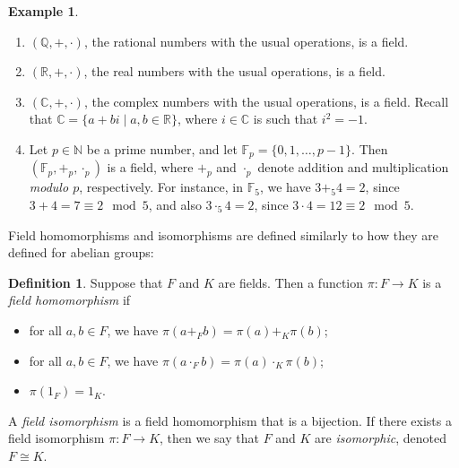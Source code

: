 \documentclass[a4paper]{memoir}
\theoremstyle{definition}
\newtheorem{definition}[theorem]{Definition}
\newtheorem{example}[theorem]{Example}
\newcommand{\bb}{\mathbb}
\newcommand{\ra}{\rightarrow}
\begin{document}
\begin{example}
  \begin{enumerate}
    \item $(\bb{Q}, +, \cdot)$, the rational numbers with the usual operations, is a field.
    \item $(\bb{R}, +, \cdot)$, the real numbers with the usual operations, is a field.
    \item $(\bb{C}, +, \cdot)$, the complex numbers with the usual operations, is a field. 
    Recall that $\bb{C} = \{a + bi \mid a,b \in \bb{R}\}$, where $i \in \bb{C}$ is such that 
    $i^2 = -1$.
    \item Let $p \in \bb{N}$ be a prime number, and let $\bb{F}_p = \{0,1,\ldots, p-1\}$. 
    Then $(\bb{F}_p, +_p, \cdot_p)$ is a field, where $+_p$ and $\cdot_p$ denote addition 
    and multiplication \emph{modulo $p$}, respectively. For instance, in $\bb{F}_5$, 
    we have $3 +_5 4 = 2$, since $3 + 4 = 7 \equiv 2 \mod 5$, and also $3 \cdot_5 4 = 2$, 
    since $3 \cdot 4 = 12 \equiv 2 \mod 5$.
  \end{enumerate}
\end{example}

Field homomorphisms and isomorphisms are defined similarly to how they are defined for 
abelian groups:

\begin{definition}
  Suppose that $F$ and $K$ are fields. Then a function $\pi : F \ra K$ is a \emph{field 
  homomorphism} if
  \begin{itemize}
    \item for all $a,b \in F$, we have $\pi(a +_F b) = \pi(a) +_K \pi(b)$;
    \item for all $a,b \in F$, we have $\pi(a \cdot_F b) = \pi(a) \cdot_K \pi(b)$;
    \item $\pi(1_F) = 1_K$.
  \end{itemize}
  A \emph{field isomorphism} is a field homomorphism that is a bijection. If there 
  exists a field isomorphism $\pi : F \ra K$, then we say that $F$ and $K$ are 
  \emph{isomorphic}, denoted $F \cong K$.
\end{definition}
\end{document}

